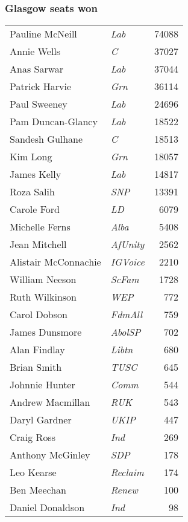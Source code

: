 \subsubsection*{Glasgow seats won}

{\footnotesize
\begin{tabular*}{\columnwidth}{@{\extracolsep{\fill}} p{} >{\itshape}l r @{\extracolsep{\fill}}}
	Pauline McNeill & Lab & 74088\\%
	Annie Wells & C & 37027\\%
	Anas Sarwar & Lab & 37044\\%
	Patrick Harvie & Grn & 36114\\%
	Paul Sweeney & Lab & 24696\\%
	Pam Duncan-Glancy & Lab & 18522\\%
	Sandesh Gulhane & C & 18513\\%
	\hline
	Kim Long & Grn & 18057\\
	James Kelly & Lab & 14817\\
	Roza Salih & SNP & 13391\\
	Carole Ford & LD & 6079\\
	Michelle Ferns & Alba & 5408\\
	Jean Mitchell & AfUnity & 2562\\
	Alistair McConnachie & IGVoice & 2210\\
	William Neeson & ScFam & 1728\\
	Ruth Wilkinson & WEP & 772\\
	Carol Dobson & FdmAll & 759\\
	James Dunsmore & AbolSP & 702\\
	Alan Findlay & Libtn & 680\\
	Brian Smith & TUSC & 645\\
	Johnnie Hunter & Comm & 544\\
	Andrew Macmillan & RUK & 543\\
	Daryl Gardner & UKIP & 447\\
	Craig Ross & Ind & 269\\
	Anthony McGinley & SDP & 178\\
	Leo Kearse & Reclaim & 174\\
	Ben Meechan & Renew & 100\\
	Daniel Donaldson & Ind & 98\\
\end{tabular*}

}

\vfill\eject

